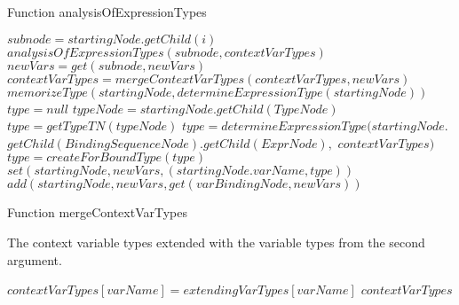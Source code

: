 \begin{algorithm}
\caption{Function analysisOfExpressionTypes}
\label{ALG_func_analysisOfExpressionTypes}
\begin{algorithmic}[1]

    \STATE $subnode = startingNode.getChild(i)$
    \STATE $analysisOfExpressionTypes(subnode, contextVarTypes)$ 
    \STATE $newVars = get(subnode, newVars)$    
    \STATE $contextVarTypes = mergeContextVarTypes(contextVarTypes, newVars)$
\ENDFOR
{}
    \STATE $memorizeType(startingNode, determineExpressionType(startingNode))$
\ENDIF
{}
    \STATE $type = null$
    \STATE $typeNode = startingNode.getChild(TypeNode)$
        \STATE $type = getTypeTN(typeNode)$
    \ELSE
        \STATE $type = determineExpressionType(startingNode.$ $getChild(BindingSequenceNode).getChild(ExprNode),$ $contextVarTypes)$
            \STATE $type = createForBoundType(type)$
        \ENDIF
    \ENDIF
    \STATE $set(startingNode, newVars, (startingNode.varName, type))$
        \STATE $add(startingNode, newVars, get(varBindingNode, newVars))$
    \ENDFOR
\ENDIF
\end{algorithmic}
\end{algorithm}

\begin{algorithm}
\caption{Function mergeContextVarTypes}
\label{ALG_function_mergeContextVarTypes}
\begin{algorithmic}[1]
\ENSURE The context variable types extended with the variable types from the second argument.

    \STATE $contextVarTypes[varName] = extendingVarTypes[varName]$
\ENDFOR
\RETURN $contextVarTypes$
\end{algorithmic}
\end{algorithm}

